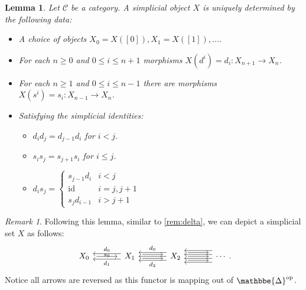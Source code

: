 \documentclass[11pt, a4paper]{amsart}
\def\DDelta{{\mathbbe{\Delta}}}
\newcommand{\DD}{\DDelta}
\newcommand{\cC}{\mathcal{C}}
\newcommand{\op}{\mathrm{op}}
\newcommand{\id}{\mathrm{id}}
\newtheorem{lemma}[equation]{Lemma}
\theoremstyle{definition}
\theoremstyle{remark}
\newtheorem{remark}[equation]{Remark}
\numberwithin{equation}{section}
\begin{document}
\begin{lemma} \label{lemma:ss diagram}
 Let $\cC$ be a category. A simplicial object $X$ is uniquely determined by the following data:
 \begin{itemize}[leftmargin=*]
  \item A choice of objects $X_0 = X([0]), X_1 = X([1]),  ...$.
  \item For each $n \geq 0$ and $0 \leq i \leq n+1$ morphisms $X(d^i) = d_i\colon X_{n+1} \to X_n$.
  \item For each $n \geq 1$ and $0 \leq i \leq n-1$ there are morphisms $X(s^i) = s_i\colon X_{n-1} \to X_n$.
  \item Satisfying the \emph{simplicial identities}:
  \begin{itemize}[leftmargin=*]
    \item $d_i d_j = d_{j-1} d_i $ for $i < j$.
    \item $s_i s_j = s_{j+1} s_i $ for $i \leq j$.
    \item $d_i s_j = \begin{cases}
    s_{j-1} d_i  & i < j \\
    \id & i = j, j+1 \\
     s_j d_{i-1} & i > j + 1
  \end{cases}$
  \end{itemize}
 \end{itemize}
\end{lemma}

\begin{remark} \label{rem:ss diagram}
  Following this lemma, similar to \cref{rem:delta}, we can depict a simplicial set $X$ as follows:
  \[
  \begin{tikzcd}[column sep=1.2cm]
   X_0 \arrow[r, shorten >=1ex,shorten <=1ex, "s_0"'  yshift= .2cm]
   & X_1 
   \arrow[l, shift left=1.4, "d_1"] \arrow[l, shift right=1.4, "d_0"'] 
   \arrow[r, shift right, shorten >=1ex,shorten <=1ex ] \arrow[r, shift left, shorten >=1ex,shorten <=1ex] 
   & X_2 
   \arrow[l] \arrow[l, shift left=2, "d_2"] \arrow[l, shift right=2, "d_0"'] 
   \arrow[r, shorten >=1ex,shorten <=1ex] \arrow[r, shift left=2, shorten >=1ex,shorten <=1ex] 
   \arrow[r, shift right=2, shorten >=1ex,shorten <=1ex]
   & \cdots 
   \arrow[l, shift right=1] \arrow[l, shift left=1] \arrow[l, shift right=3] \arrow[l, shift left=3] 
 \end{tikzcd}.
  \]
  Notice all arrows are reversed as this functor is mapping out of $\DD^{\op}$.
\end{remark}
\end{document}
